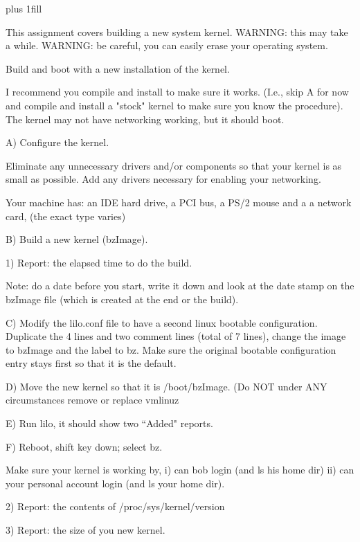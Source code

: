 
\rightskip=0pt plus 1fill

\parindent 0pt

This assignment covers building a new system kernel.
WARNING: this may take a while.
WARNING: be careful, you can easily erase your operating system.

Build and boot with a new installation of the kernel.


I recommend you compile and install to make sure it works.
(I.e., skip A for now and compile and install a "stock" kernel to
make sure you know the procedure).
The kernel may not have networking working, but it should boot.

A) Configure the kernel. 

Eliminate any unnecessary drivers and/or components so that your kernel is
as small as possible.
Add any drivers necessary for enabling your networking.

Your machine has:
an IDE hard drive, a PCI bus, a PS/2 mouse
and a
a network card, (the exact type varies)

B) Build a new kernel ({\ltt{}bzImage}).

1) Report: the elapsed time to do the build.

Note: do a date before you start, write it down and look at
the date stamp on the {\ltt{}bzImage} file (which is created at
the end or the build).

C) Modify the {\ltt{}lilo.conf} file to have a second linux
bootable configuration.
Duplicate the 4 lines and two comment lines (total of 7 lines),
change the image to {\ltt{}bzImage} and the label to {\ltt{}bz}.
Make sure the original bootable configuration entry stays first so that
it is the default.

D) Move the new kernel so that it is {\ltt{}/boot/bzImage}.
(Do NOT under ANY circumstances remove or replace {\ltt{}vmlinuz}

E) Run lilo, it should show two ``Added" reports.

F) Reboot, shift key down; select bz.

Make sure your kernel is working by,
i) can bob login (and ls his home dir)
ii) can your personal account login (and ls your home dir). 

2) Report: the contents of {\ltt{}/proc/sys/kernel/version} 

3) Report: the size of you new kernel.

\bye
